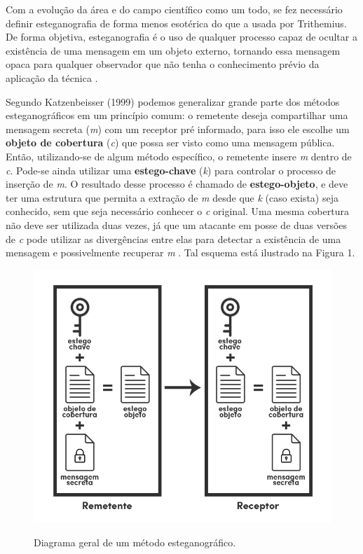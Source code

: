 Com a evolução da área e do campo científico como um todo, se fez necessário definir esteganografia de forma menos esotérica do que a usada por Trithemius. De forma objetiva, esteganografia é o uso de qualquer processo capaz de ocultar a existência de uma mensagem em um objeto externo, tornando essa mensagem opaca para qualquer observador que não tenha o conhecimento prévio da aplicação da técnica \cite{judge}. 

Segundo Katzenbeisser (1999) podemos generalizar grande parte dos métodos esteganográficos em um princípio comum: o remetente deseja compartilhar uma mensagem secreta (\textit{m}) com um receptor pré informado, para isso ele escolhe um \textbf{objeto de cobertura} (\textit{c}) que possa ser visto como uma mensagem pública. Então, utilizando-se de algum método específico, o remetente insere \textit{m} dentro de \textit{c}. Pode-se ainda utilizar uma \textbf{estego-chave} (\textit{k}) para controlar o processo de inserção de \textit{m}. O resultado desse processo é chamado de \textbf{estego-objeto}, e deve ter uma estrutura que permita a extração de \textit{m} desde que \textit{k} (caso exista) seja conhecido, sem que seja necessário conhecer o \textit{c} original. Uma mesma cobertura não deve ser utilizada duas vezes, já que um atacante em posse de duas versões de \textit{c} pode utilizar as divergências entre elas para detectar a existência de uma mensagem e possivelmente recuperar \textit{m} \cite{petitcolas}. Tal esquema está ilustrado na Figura 1.

\begin{figure}[!htb]
     \centering
     \caption{Diagrama geral de um método esteganográfico.}
     \includegraphics[width=13cm]{images/TCC1.png}
     \label{fig_steg}
\end{figure}

